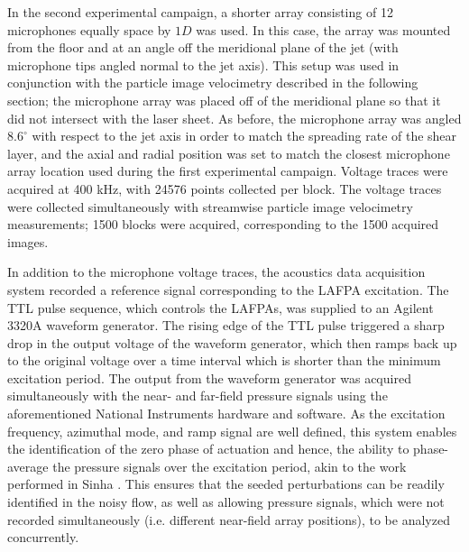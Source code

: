 In the second experimental campaign, a shorter array consisting of 12 microphones equally space by $1D$ was used. 
In this case, the array was mounted from the floor and at an angle off the meridional plane of the jet (with microphone tips angled normal to the jet axis).
This setup was used in conjunction with the particle image velocimetry described in the following section; the microphone array was placed off of the meridional plane so that it did not intersect with the laser sheet. 
As before, the microphone array was angled $8.6^\circ$ with respect to the jet axis in order to match the spreading rate of the shear layer, and the axial and radial position was set to match the closest microphone array location used during the first experimental campaign.
Voltage traces were acquired at 400 kHz, with 24576 points collected per block.
The voltage traces were collected simultaneously with streamwise particle image velocimetry measurements; 1500 blocks were acquired, corresponding to the 1500 acquired images.

In addition to the microphone voltage traces, the acoustics data acquisition system recorded a reference signal corresponding to the LAFPA excitation. 
The TTL pulse sequence, which controls the LAFPAs, was supplied to an Agilent 3320A waveform generator. 
The rising edge of the TTL pulse triggered a sharp drop in the output voltage of the waveform generator, which then ramps back up to the original voltage over a time interval which is shorter than the minimum excitation period. 
The output from the waveform generator was acquired simultaneously with the near- and far-field pressure signals using the aforementioned National Instruments hardware and software. 
As the excitation frequency, azimuthal mode, and ramp signal are well defined, this system enables the identification of the zero phase of actuation and hence, the ability to phase-average the pressure signals over the excitation period, akin to the work performed in Sinha \etal \citep{Sinha2012}.
This ensures that the seeded perturbations can be readily identified in the noisy flow, as well as allowing pressure signals, which were not recorded simultaneously (i.e. different near-field array positions), to be analyzed concurrently. 

